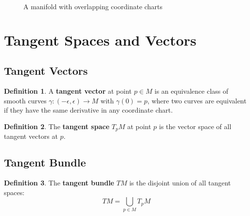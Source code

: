 \documentclass[11pt]{article}
\theoremstyle{definition}
\newtheorem{definition}{Definition}[section]
\begin{document}
\begin{figure}[h]
\centering
{}
\caption{A manifold with overlapping coordinate charts}
\end{figure}

\section{Tangent Spaces and Vectors}

\subsection{Tangent Vectors}
\begin{definition}
A \textbf{tangent vector} at point $p \in M$ is an equivalence class of smooth curves $\gamma: (-\epsilon, \epsilon) \to M$ with $\gamma(0) = p$, where two curves are equivalent if they have the same derivative in any coordinate chart.
\end{definition}

\begin{definition}
The \textbf{tangent space} $T_pM$ at point $p$ is the vector space of all tangent vectors at $p$.
\end{definition}

\subsection{Tangent Bundle}
\begin{definition}
The \textbf{tangent bundle} $TM$ is the disjoint union of all tangent spaces:
$$TM = \bigcup_{p \in M} T_pM$$
\end{definition}
\end{document}
